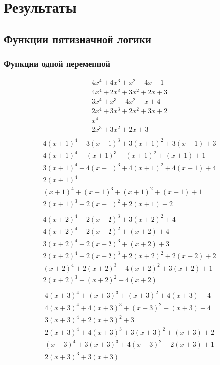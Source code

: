 \documentclass[bibliography=totoc, a4paper, 12pt]{extarticle}
\let\stdsection\section
\renewcommand\section{\newpage\stdsection}
\begin{document}
\section{Результаты}

\subsection{Функции пятизначной логики}

\subsubsection{Функции одной переменной}
$$\begin{array}{l}
4x^4 + 4x^3 + x^2 + 4x + 1\\
4x^4 + 2x^3 + 3x^2 + 2x + 3\\
3x^4 + x^3 + 4x^2 + x + 4\\
2x^4 + 3x^3 + 2x^2 + 3x + 2\\
x^4\\
2x^3 + 3x^2 + 2x + 3\\
\end{array}$$
$$\begin{array}{l}
4(x+1)^4 + 3(x+1)^3 + 3(x+1)^2 + 3(x+1) + 3\\
4(x+1)^4 + (x+1)^3 + (x+1)^2 + (x+1) + 1\\
3(x+1)^4 + 4(x+1)^3 + 4(x+1)^2 + 4(x+1) + 4\\
2(x+1)^4\\
(x+1)^4 + (x+1)^3 + (x+1)^2 + (x+1) + 1\\
2(x+1)^3 + 2(x+1)^2 + 2(x+1) + 2\\
\end{array}$$
$$\begin{array}{l}
4(x+2)^4 + 2(x+2)^3 + 3(x+2)^2 + 4\\
4(x+2)^4 + 2(x+2)^2 + (x+2) + 4\\
3(x+2)^4 + 2(x+2)^3 + (x+2) + 3\\
2(x+2)^4 + 2(x+2)^3 + 2(x+2)^2 + 2(x+2) + 2\\
(x+2)^4 + 2(x+2)^3 + 4(x+2)^2 + 3(x+2) + 1\\
2(x+2)^3 + (x+2)^2 + 4(x+2)\\
\end{array}$$
$$\begin{array}{l}
4(x+3)^4 + (x+3)^3 + (x+3)^2 + 4(x+3) + 4\\
4(x+3)^4 + 4(x+3)^3 + (x+3)^2 + (x+3) + 4\\
3(x+3)^4 + 2(x+3)^2 + 3\\
2(x+3)^4 + 4(x+3)^3 + 3(x+3)^2 + (x+3) + 2\\
(x+3)^4 + 3(x+3)^3 + 4(x+3)^2 + 2(x+3) + 1\\
2(x+3)^3 + 3(x+3)\\
\end{array}$$
\end{document}
